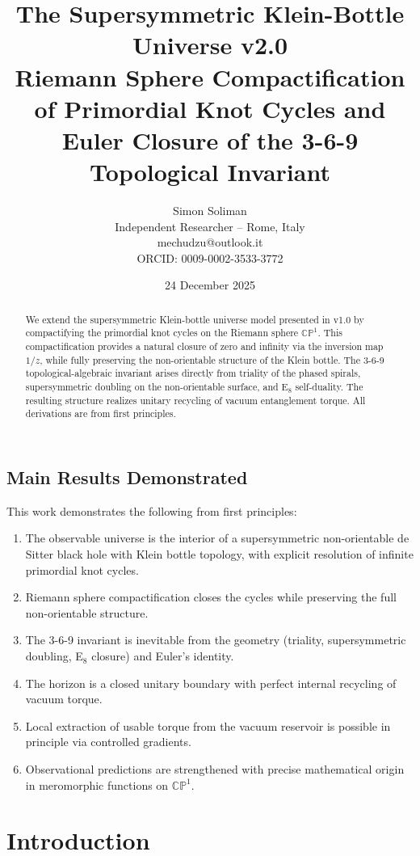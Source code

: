 \documentclass[11pt,a4paper]{article}
\title{The Supersymmetric Klein-Bottle Universe v2.0 \\
Riemann Sphere Compactification of Primordial Knot Cycles and Euler Closure of the 3-6-9 Topological Invariant}
\author{Simon Soliman \\
Independent Researcher – Rome, Italy \\
mechudzu@outlook.it \\
ORCID: 0009-0002-3533-3772}
\date{24 December 2025}
\begin{document}
\maketitle

\begin{abstract}
We extend the supersymmetric Klein-bottle universe model presented in v1.0 by compactifying the primordial knot cycles on the Riemann sphere $\mathbb{CP}^1$. This compactification provides a natural closure of zero and infinity via the inversion map $1/z$, while fully preserving the non-orientable structure of the Klein bottle. The 3-6-9 topological-algebraic invariant arises directly from triality of the phased spirals, supersymmetric doubling on the non-orientable surface, and E$_8$ self-duality. The resulting structure realizes unitary recycling of vacuum entanglement torque. All derivations are from first principles.
\end{abstract}

\subsection*{Main Results Demonstrated}

This work demonstrates the following from first principles:

\begin{enumerate}
\item The observable universe is the interior of a supersymmetric non-orientable de Sitter black hole with Klein bottle topology, with explicit resolution of infinite primordial knot cycles.
\item Riemann sphere compactification closes the cycles while preserving the full non-orientable structure.
\item The 3-6-9 invariant is inevitable from the geometry (triality, supersymmetric doubling, E$_8$ closure) and Euler's identity.
\item The horizon is a closed unitary boundary with perfect internal recycling of vacuum torque.
\item Local extraction of usable torque from the vacuum reservoir is possible in principle via controlled gradients.
\item Observational predictions are strengthened with precise mathematical origin in meromorphic functions on $\mathbb{CP}^1$.
\end{enumerate}

\section{Introduction}
\end{document}
